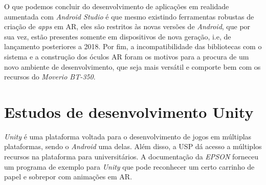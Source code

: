 
O que podemos concluir do desenvolvimento de aplicações em realidade aumentada com \textit{Android Studio} é que mesmo existindo ferramentas robustas de criação de \textit{apps} em AR, eles são restritos às novas versões de \textit{Android}, que por sua vez, estão presentes somente em dispositivos de nova geração, i.e, de lançamento posteriores a 2018. Por fim, a incompatibilidade das bibliotecas com o sistema e a construção dos óculos AR foram os motivos para a procura de um novo ambiente de desenvolvimento, que seja mais versátil e comporte bem com os recursos do \textit{Moverio BT-350}.

\section{Estudos de desenvolvimento Unity}

\textit{Unity} é uma plataforma voltada para o desenvolvimento de jogos em múltiplas plataformas, sendo o \textit{Android} uma delas. Além disso, a USP dá acesso a múltiplos recursos na plataforma para universitários. A documentação da \textit{EPSON} forneceu um programa de exemplo para \textit{Unity} que pode reconhecer um certo carrinho de papel e sobrepor com animações em AR.

